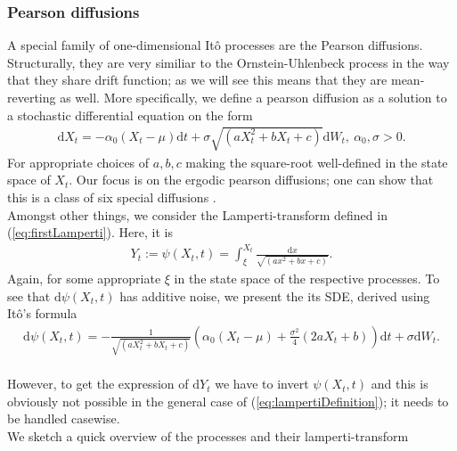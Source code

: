 \subsubsection{Pearson diffusions}
A special family of one-dimensional Itô processes are the Pearson diffusions. Structurally, they are very similiar to the Ornstein-Uhlenbeck process in the way that they share drift function; as we will see this means that they are mean-reverting as well. More specifically, we define a pearson diffusion as a solution to a stochastic differential equation on the form
\begin{align}
    \mathrm{d}X_t = -\alpha_0 \left(X_t - \mu\right)\mathrm{d}t + \sigma\sqrt{\left(aX_t^2 + bX_t + c\right)}\mathrm{d}W_t, \: \alpha_0, \sigma > 0. \label{eq:pearsonDiffusion}
\end{align}
For appropriate choices of $a, b, c$ making the square-root well-defined in the state space of $X_t$. Our focus is on the ergodic pearson diffusions; one can show that this is a class of six special diffusions \cite[p.36]{StatisticalMethodsForSDE}. \\
Amongst other things, we consider the Lamperti-transform defined in (\ref{eq:firstLamperti}). Here, it is
\begin{align}
    Y_t := \psi\left(X_t, t\right) = \int_{\xi}^{X_t} \frac{\mathrm{d}x}{\sqrt{\left(ax^2 + bx + c\right)}}. \label{eq:lampertiDefinition}
\end{align}
Again, for some appropriate $\xi$ in the state space of the respective processes. To see that $\mathrm{d}\psi\left(X_t, t\right)$ has additive noise, we present the its SDE, derived using Itô's formula
\begin{align}
    \mathrm{d}\psi\left(X_t, t\right) = - \frac{1}{\sqrt{\left(aX_t^2 + bX_t + c\right)}}\left(\alpha_0\left(X_t - \mu\right) + \frac{\sigma^2}{4}\left(2aX_t + b\right)\right)\mathrm{d}t + \sigma \mathrm{d}W_t.
\end{align}\\
However, to get the expression of $\mathrm{d}Y_t$ we have to invert $\psi\left(X_t, t\right)$ and this is obviously not possible in the general case of (\ref{eq:lampertiDefinition}); it needs to be handled casewise.\\
We sketch a quick overview of the processes \cite[p.36]{StatisticalMethodsForSDE} and their lamperti-transform\\\\
